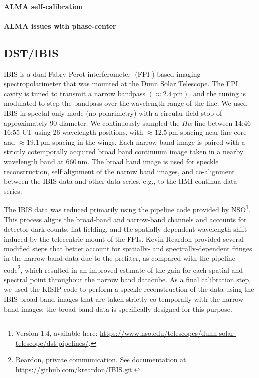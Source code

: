 \documentclass[twocolumn]{aastex62}
\newcommand{\unit}[1]{\ensuremath{\, \mathrm{#1}}}
\newcommand{\halpha}{\ensuremath{H\alpha}}
\begin{document}
\paragraph{ALMA self-calibration}
\paragraph{ALMA issues with phase-center}

\subsection{DST/IBIS}
IBIS is a dual Fabry-Perot interferometer- (FPI-) based imaging spectropolarimeter that was mounted at the Dunn Solar Telescope.
The FPI cavity is tuned to transmit a narrow bandpass $(\approx 2.4\unit{pm})$, and the tuning is modulated to step the bandpass over the wavelength range of the line.
We used IBIS in spectal-only mode (no polarimetry) with a circular field stop of approximately 90\arcsec{} diameter.
We continuously sampled the \halpha{} line between 14:46-16:55 UT using 26 wavelength positions, with $\approx 12.5\unit{pm}$ spacing near line core and $\approx 19.1\unit{pm}$ spacing in the wings.  
Each narrow band image is paired with a strictly cotemporally acquired broad band continuum image taken in a nearby wavelength band at $660\unit{nm}$.
The broad band image is used for speckle reconstruction, self alignment of the narrow band images, and co-alignment between the IBIS data and other data series, e.g., to the HMI continua data series. \par

The IBIS data was reduced primarily using the pipeline code provided by NSO\footnote{Version 1.4, available here: \url{https://www.nso.edu/telescopes/dunn-solar-telescope/dst-pipelines/}.}.  
This process aligns the broad-band and narrow-band channels and accounts for detector dark counts, flat-fielding, and the spatially-dependent wavelength shift induced by the telecentric mount of the FPIs.  
Kevin Reardon provided several modified steps that better account for spatially- and spectrally-dependent fringes in the narrow band data due to the prefilter, as compared with the pipeline code\footnote{Reardon, private communication.  See documentation at \url{https://github.com/kreardon/IBIS.git}.}, which resulted in an improved estimate of the gain for each spatial and spectral point throughout the narrow band datacube.  
As a final calibration step, we used the KISIP code \citep{2008WoegerSPIE,2008WoegerEA_Speckle} to perform a speckle reconstruction of the data using the IBIS broad band images that are taken strictly co-temporally with the narrow band images; the broad band data is specifically designed for this purpose\citep{2008Cauzzi}.\par
\end{document}

